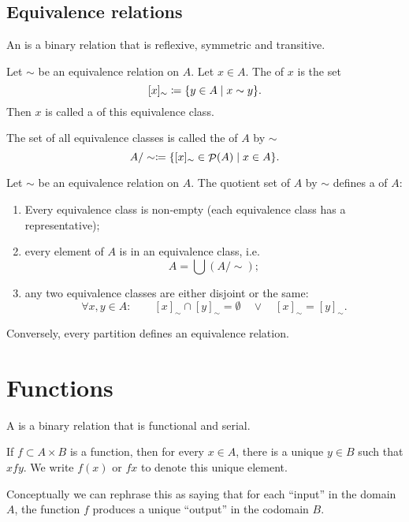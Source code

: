 \subsection{Equivalence relations}
\begin{definition}
An  is a binary relation that is reflexive, symmetric and transitive.
\end{definition}
\begin{definition}
Let $\sim$ be an equivalence relation on $A$. Let $x\in A$. The  of $x$ is the set
\[ [x]_\sim \coloneqq \{ y\in A\;|\; x\sim y \}. \]
Then $x$ is called a  of this equivalence class.

The set of all equivalence classes is called the  of $A$ by $\sim$
\[ A/\sim \coloneqq \{ [x]_\sim \in \mathop{\mathcal{P}}(A) \;|\; x\in A \}. \]
\end{definition}
\begin{proposition}
Let $\sim$ be an equivalence relation on $A$. The quotient set of $A$ by $\sim$ defines a  of $A$:
\begin{enumerate}
\item Every equivalence class is non-empty (each equivalence class has a representative);
\item every element of $A$ is in an equivalence class, i.e.
\[ A = \bigcup (A/\sim); \]
\item any two equivalence classes are either disjoint or the same:
\[ \forall x,y\in A: \qquad[x]_\sim \cap [y]_\sim = \emptyset \quad \lor \quad [x]_\sim = [y]_\sim. \]
\end{enumerate}
Conversely, every partition defines an equivalence relation.
\end{proposition}

\section{Functions}
\begin{definition}
A  is a binary relation that is functional and serial.
\end{definition}
If $f\subset A\times B$ is a function, then for every $x\in A$, there is a unique $y\in B$ such that $xfy$. We write $f(x)$ or $fx$ to denote this unique element.

Conceptually we can rephrase this as saying that for each ``input'' in the domain $A$, the function $f$ produces a unique ``output'' in the codomain $B$.

